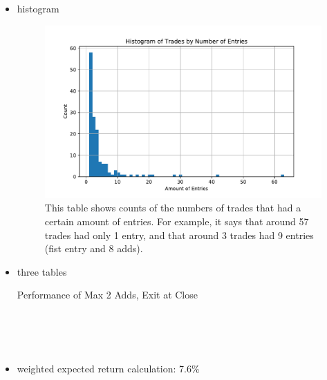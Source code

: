 \documentclass{article}
\begin{document}
\begin{itemize}
	\item histogram
	
	\begin{figure}
	\includegraphics[width=\textwidth]{prog_entry_exit4_hist.pdf}
	\caption{This table shows counts of the numbers of trades that had a certain amount of entries. For example, it says that around 57 trades had only 1 entry, and that around 3 trades had 9 entries (fist entry and 8 adds).}
	\label{hist_strat_exit4}
	\end{figure}
	
	\item three tables
	
	\begin{table}
\caption{Performance of Max 2 Adds, Exit at Close}
\\[2ex]


\\[2ex]


\\[2ex]

\label{tab_strat_lim3_exit4}
\end{table}

	\item weighted expected return calculation: 7.6\%
\end{itemize}
\end{document}
